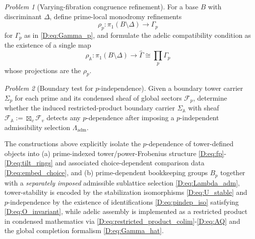 \documentclass[11pt]{article}
\theoremstyle{remark}
\newtheorem{problem}{Problem}
\begin{document}
{\begin{problem}[Varying-fibration congruence refinement]\label{D:prob:varying_tau}
For a base $B$ with discriminant $\Delta$, define prime-local monodromy refinements
\begin{equation}
\rho_{p}:\pi_{1}(B\setminus\Delta)\to \Gamma_{p}
\label{D:eq:rho_p}
\end{equation}
for $\Gamma_{p}$ as in \eqref{D:eq:Gamma_p}, and formulate the adelic compatibility condition as the existence of a single map
\begin{equation}
\rho_{\mathbb A}:\pi_{1}(B\setminus\Delta)\to \widehat{\Gamma}\cong \prod_{p}\Gamma_{p}
\label{D:eq:rho_A}
\end{equation}
whose projections are the $\rho_{p}$.
\end{problem}

\begin{problem}[Boundary test for $p$-independence]\label{D:prob:AdSCFT}
Given a boundary tower carrier $\Sigma_{p}$ for each prime and its condensed sheaf of global sectors $\mathcal F_{p}$, determine whether the induced restricted-product boundary carrier $\Sigma_{\mathbb A}$ with sheaf $\mathcal F_{\mathbb A}:=\boxtimes_{v}\mathcal F_{v}$ detects any $p$-dependence after imposing a $p$-independent admissibility selection $\Lambda_{\mathrm{adm}}$.
\end{problem} 
The constructions above explicitly isolate the $p$-dependence of tower-defined objects into (a) prime-indexed tower/power-Frobenius structure \eqref{D:eq:fp}-\eqref{D:eq:tilt_rings} and associated choice-dependent comparison data \eqref{D:eq:embed_choice}, and (b) prime-dependent bookkeeping groups $B_{p}$ together with a \emph{separately imposed} admissible sublattice selection \eqref{D:eq:Lambda_adm}, tower-stability is encoded by the stabilization isomorphisms \eqref{D:eq:U_stable} and $p$-independence by the existence of identifications \eqref{D:eq:pindep_iso} satisfying \eqref{D:eq:O_invariant}, while adelic assembly is implemented as a restricted product in condensed mathematics via \eqref{D:eq:restricted_product_colim}-\eqref{D:eq:AQ} and the global completion formalism \eqref{D:eq:Gamma_hat}.







}
\end{document}
